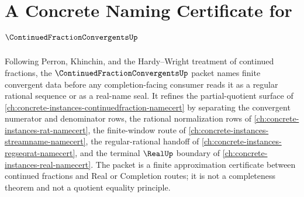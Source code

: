 \chapter{A Concrete Naming Certificate for $\ContinuedFractionConvergentsUp$}
\label{ch:concrete-instances-continued-fraction-convergents-namecert}

Following Perron, Khinchin, and the Hardy--Wright treatment of continued
fractions, the $\ContinuedFractionConvergentsUp$ packet names finite
convergent data before any completion-facing consumer reads it as a regular
rational sequence or as a real-name seal. It refines the partial-quotient
surface of \autoref{ch:concrete-instances-continuedfraction-namecert} by
separating the convergent numerator and denominator rows, the rational
normalization rows of \autoref{ch:concrete-instances-rat-namecert}, the
finite-window route of \autoref{ch:concrete-instances-streamname-namecert},
the regular-rational handoff of
\autoref{ch:concrete-instances-regseqrat-namecert}, and the terminal
$\RealUp$ boundary of \autoref{ch:concrete-instances-real-namecert}. The
packet is a finite approximation certificate between continued fractions and
Real or Completion routes; it is not a completeness theorem and not a
quotient equality principle.

